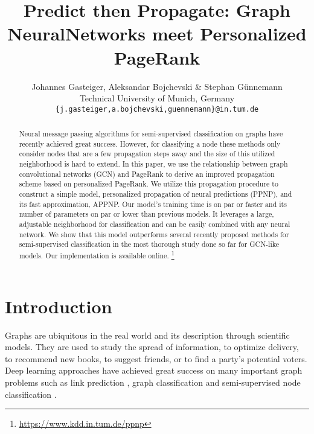 \documentclass{article} \usepackage{iclr2019_conference,times}
\title{Predict then Propagate: Graph Neural\newline Networks meet Personalized PageRank}
\author{Johannes Gasteiger, Aleksandar Bojchevski \& Stephan Günnemann\\
Technical University of Munich, Germany\\
\texttt{\{j.gasteiger,a.bojchevski,guennemann\}@in.tum.de}
}
\begin{document}
\maketitle

\begin{abstract}
    Neural message passing algorithms for semi-supervised classification on graphs have recently achieved great success. However, for classifying a node these methods only consider nodes that are a few propagation steps away and the size of this utilized neighborhood is hard to extend. In this paper, we use the relationship between graph convolutional networks (GCN) and PageRank to derive an improved propagation scheme based on personalized PageRank. We utilize this propagation procedure to construct a simple model, personalized propagation of neural predictions (PPNP), and its fast approximation, APPNP. Our model's training time is on par or faster and its number of parameters on par or lower than previous models. It leverages a large, adjustable neighborhood for classification and can be easily combined with any neural network. We show that this model outperforms several recently proposed methods for semi-supervised classification in the most thorough study done so far for GCN-like models. Our implementation is available online. \footnote{\url{https://www.kdd.in.tum.de/ppnp}}
\end{abstract}



\section{Introduction}

Graphs are ubiquitous in the real world and its description through scientific models. They are used to study the spread of information, to optimize delivery, to recommend new books, to suggest friends, or to find a party’s potential voters.
Deep learning approaches have achieved great success on many important graph problems such as link prediction \citep{grover_node2vec:_2016,bojchevski_netgan:_2018}, graph classification \citep{duvenaud_convolutional_2015,niepert_learning_2016,gilmer_neural_2017} and semi-supervised node classification \citep{yang_revisiting_2016,kipf_semi-supervised_2017}.
\end{document}
